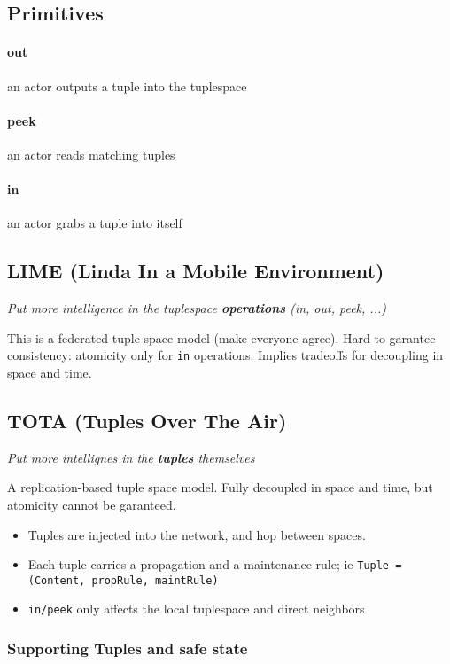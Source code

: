 \documentclass[a4paper]{report}
\begin{document}
\subsection{Primitives}

\paragraph{out} an actor outputs a tuple into the tuplespace 
\paragraph{peek} an actor reads matching tuples 
\paragraph{in} an actor grabs a tuple into itself

\subsection{LIME (Linda In a Mobile Environment)}

\emph{Put more intelligence in the tuplespace \textbf{operations} (in, out, peek, ...)}

This is a federated tuple space model (make everyone agree). Hard to garantee consistency: atomicity only for \texttt{in} operations. Implies tradeoffs for decoupling in space and time.

\subsection{TOTA (Tuples Over The Air)}

\emph{Put more intellignes in the \textbf{tuples} themselves}

A replication-based tuple space model. Fully decoupled in space and time, but atomicity cannot be garanteed.

\begin{itemize}
\item Tuples are injected into the network, and hop between spaces.
\item Each tuple carries a propagation and a maintenance rule; ie \texttt{Tuple = (Content, propRule, maintRule)}
\item \texttt{in/peek} only affects the local tuplespace and direct neighbors
\end{itemize}

\subsubsection{Supporting Tuples and safe state}
\end{document}
